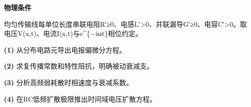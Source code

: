 \textbf{物理条件}\par 均匀传输线每单位长度串联电阻R′≥0、电感L′>0、并联漏导G′≥0、电容C′>0。取电压V(x,t)、电流I(x,t)与e\textasciicircum{}\{−iωt\}相位约定。
\par\noindent\textbf{(1)} 从分布电路元导出电报偏微分方程。
\par\noindent\textbf{(2)} 求复传播常数和特性阻抗，明确被动衰减支。
\par\noindent\textbf{(3)} 分析高频弱耗散时相速度与衰减系数。
\par\noindent\textbf{(4)} 在RC低频扩散极限推出时间域电压扩散方程。
